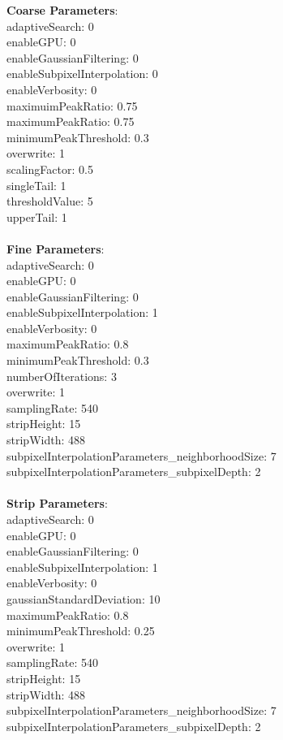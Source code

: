 \documentclass[11pt]{article}
\begin{document}
\textbf{Coarse Parameters}: \\
adaptiveSearch: 0\\
enableGPU: 0\\
enableGaussianFiltering: 0\\
enableSubpixelInterpolation: 0\\
enableVerbosity: 0\\
maximuimPeakRatio: 0.75\\
maximumPeakRatio: 0.75\\
minimumPeakThreshold: 0.3\\
overwrite: 1\\
scalingFactor: 0.5\\
singleTail: 1\\
thresholdValue: 5\\
upperTail: 1\\
\\
\textbf{Fine Parameters}: \\
adaptiveSearch: 0\\
enableGPU: 0\\
enableGaussianFiltering: 0\\
enableSubpixelInterpolation: 1\\
enableVerbosity: 0\\
maximumPeakRatio: 0.8\\
minimumPeakThreshold: 0.3\\
numberOfIterations: 3\\
overwrite: 1\\
samplingRate: 540\\
stripHeight: 15\\
stripWidth: 488\\
subpixelInterpolationParameters\_neighborhoodSize: 7\\
subpixelInterpolationParameters\_subpixelDepth: 2\\
\\
\textbf{Strip Parameters}: \\
adaptiveSearch: 0\\
enableGPU: 0\\
enableGaussianFiltering: 0\\
enableSubpixelInterpolation: 1\\
enableVerbosity: 0\\
gaussianStandardDeviation: 10\\
maximumPeakRatio: 0.8\\
minimumPeakThreshold: 0.25\\
overwrite: 1\\
samplingRate: 540\\
stripHeight: 15\\
stripWidth: 488\\
subpixelInterpolationParameters\_neighborhoodSize: 7\\
subpixelInterpolationParameters\_subpixelDepth: 2\\
\\
\newpage
\end{document}
